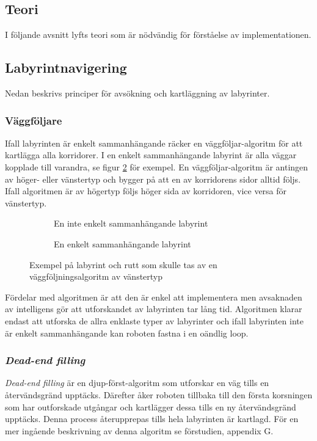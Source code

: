 \documentclass[11pt]{article}
\begin{document}
\begin{flushleft}
\pagebreak

\section{Teori}
I följande avsnitt lyfts teori som är nödvändig för förståelse av implementationen.

\subsection{Labyrintnavigering}
Nedan beskrivs principer för avsökning och kartläggning av labyrinter.

\subsubsection{Väggföljare}
Ifall labyrinten är enkelt sammanhängande räcker en väggföljar-algoritm för att kartlägga alla korridorer. I en enkelt sammanhängande labyrint är alla väggar kopplade till varandra, se figur \ref{maze} för exempel. En väggföljar-algoritm är antingen av höger- eller vänstertyp och bygger på att en av korridorens sidor alltid följs. Ifall algoritmen är av högertyp följs höger sida av korridoren, vice versa för vänstertyp.

\begin{figure}[htbp]
	\centering
	\begin{subfigure}{.5\linewidth}
		\centering
		\noindent\resizebox{.5\textwidth}{!}{
			}
		\caption{En inte enkelt sammanhängande labyrint}	
		\label{non-connected}
	\end{subfigure}%
	\begin{subfigure}{.5\linewidth}
		\centering
		\noindent\resizebox{.5\textwidth}{!}{
			}
		\caption{En enkelt sammanhängande labyrint}	
	\end{subfigure}%
	\caption{Exempel på labyrint och rutt som skulle tas av en väggföljningsalgoritm av vänstertyp}
	\label{maze}
\end{figure}%

Fördelar med algoritmen är att den är enkel att implementera men avsaknaden av intelligens gör att utforskandet av labyrinten tar lång tid. Algoritmen klarar endast att utforska de allra enklaste typer av labyrinter och ifall labyrinten inte är enkelt sammanhängande kan roboten fastna i en oändlig loop.

\subsubsection{\emph{Dead-end filling}}
\emph{Dead-end filling} är en djup-först-algoritm som utforskar en väg tills en återvändsgränd upptäcks. Därefter åker roboten tillbaka till den första korsningen som har outforskade utgångar och kartlägger dessa tills en ny återvändsgränd upptäcks. Denna process återupprepas tills hela labyrinten är kartlagd. För en mer ingående beskrivning av denna algoritm se förstudien, appendix G.


\end{flushleft}
\end{document}
